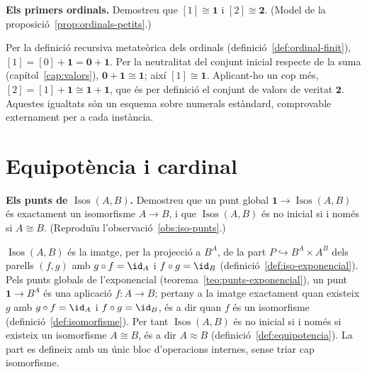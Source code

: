 \begin{exercici}
\textbf{Els primers ordinals.} Demostreu que \([1]\cong\mathbf1\) i \([2]\cong\mathbf2\). (Model de la proposició~\ref{prop:ordinals-petits}.)
\end{exercici}
\begin{solucio}
Per la definició recursiva metateòrica dels ordinals (definició~\ref{def:ordinal-finit}), \([1]=[0]+\mathbf1=\mathbf0+\mathbf1\). Per la neutralitat del conjunt inicial respecte de la suma (capítol~\ref{cap:valors}), \(\mathbf0+\mathbf1\cong\mathbf1\); així \([1]\cong\mathbf1\). Aplicant-ho un cop més, \([2]=[1]+\mathbf1\cong\mathbf1+\mathbf1\), que és per definició el conjunt de valors de veritat \(\mathbf2\). Aquestes igualtats són un esquema sobre numerals estàndard, comprovable externament per a cada instància.
\end{solucio}

\section{Equipotència i cardinal}\label{prac:equipotencia}

\begin{exercici}
\textbf{Els punts de \(\operatorname{Isos}(A,B)\).} Demostreu que un punt global \(\mathbf1\to\operatorname{Isos}(A,B)\) és exactament un isomorfisme \(A\to B\), i que \(\operatorname{Isos}(A,B)\) és no inicial si i només si \(A\cong B\). (Reproduïu l'observació~\ref{obs:iso-punts}.)
\end{exercici}
\begin{solucio}
\(\operatorname{Isos}(A,B)\) és la imatge, per la projecció a \(B^{A}\), de la part \(P\hookrightarrow B^{A}\times A^{B}\) dels parells \((f,g)\) amb \(g\circ f=\id_A\) i \(f\circ g=\id_B\) (definició~\ref{def:iso-exponencial}). Pels punts globals de l'exponencial (teorema~\ref{teo:punts-exponencial}), un punt \(\mathbf1\to B^{A}\) és una aplicació \(f\colon A\to B\); pertany a la imatge exactament quan existeix \(g\) amb \(g\circ f=\id_A\) i \(f\circ g=\id_B\), és a dir quan \(f\) és un isomorfisme (definició~\ref{def:isomorfisme}). Per tant \(\operatorname{Isos}(A,B)\) és no inicial si i només si existeix un isomorfisme \(A\cong B\), és a dir \(A\approx B\) (definició~\ref{def:equipotencia}). La part es defineix amb un únic bloc d'operacions internes, sense triar cap isomorfisme.
\end{solucio}

